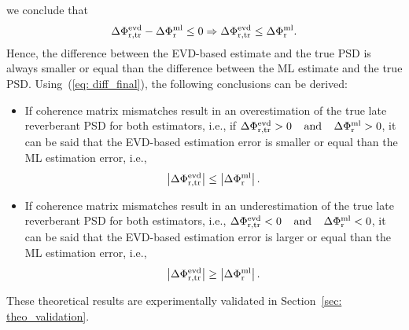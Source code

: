 \documentclass[10pt]{IEEEtran}
\begin{document}
we conclude that
\begin{equation}
\label{eq: diff_final}
\Delta \Phi^{\rm evd}_{\rm r,tr} - \Delta \Phi^{\rm ml}_{\rm r} \leq 0 \Rightarrow \Delta \Phi^{\rm evd}_{\rm r,tr} \leq \Delta \Phi^{\rm ml}_{\rm r}.
\end{equation}
Hence, the difference between the EVD-based estimate and the true PSD is always smaller or equal than the difference between the ML estimate and the true PSD.
Using~(\ref{eq: diff_final}), the following conclusions can be derived:
\begin{itemize}
\item If coherence matrix mismatches result in an overestimation of the true late reverberant PSD for both estimators, i.e., if $\Delta \Phi^{\rm evd}_{\rm r,tr} > 0 \; \; \; \; {\text{and}} \; \; \; \; \Delta \Phi^{\rm ml}_{\rm r} > 0$, it can be said that the EVD-based estimation error is smaller or equal than the ML estimation error, i.e., 
\begin{equation}
\left|\Delta \Phi^{\rm evd}_{\rm r,tr} \right| \leq  \left|\Delta \Phi^{\rm ml}_{\rm r} \right|.
\end{equation}
\item If coherence matrix mismatches result in an underestimation of the true late reverberant PSD for both estimators, i.e., $\Delta \Phi^{\rm evd}_{\rm r,tr} < 0 \; \; \; \; {\text{and}} \; \; \; \; \Delta \Phi^{\rm ml}_{\rm r} < 0$, it can be said that the EVD-based estimation error is larger or equal than the ML estimation error, i.e., 
\begin{equation}
\left|\Delta \Phi^{\rm evd}_{\rm r,tr} \right| \geq  \left|\Delta \Phi^{\rm ml}_{\rm r} \right|.
\end{equation}
\end{itemize}
These theoretical results are experimentally validated in Section~\ref{sec: theo_validation}.
\end{document}
